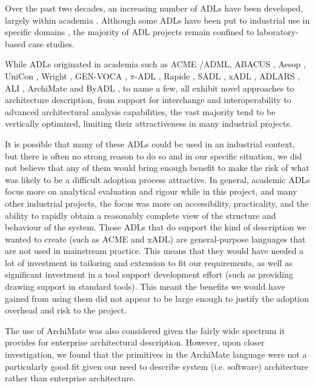   Over the past two decades, an increasing number of ADLs have been developed, largely within academia 
  \cite{medvidovic2000-adlcomparison, clements1996-adlsurvey}. Although some ADLs have been put to industrial use in specific domains
\cite{cuenot2010-east, oquendo2004-piadl, vanommering2000-koala, sae2009-aadl}, the 
majority of ADL projects remain confined to laboratory-based case studies.

  While ADLs originated in academia such as ACME \cite{garlan1997-acme}/ADML, 
  ABACUS \cite{dunsire2005-abacus}, Aesop \cite{garlan1994-aesop}, 
  UniCon \cite{shaw1996-unicon}, Wright \cite{allen1996-wright}, GEN-VOCA \cite{batory1997-genvoca}, $\pi$-ADL \cite{oquendo2004-piadl}, Rapide \cite{luckham1995-rapideexample}, SADL \cite{moriconi1997-sadl}, 
  xADL \cite{khare2001-xadl}, ADLARS \cite{bashroush2005-adlars}, ALI \cite{bashroush2008-ali}, 
  ArchiMate \cite{lankhorst2009-archimate} and ByADL \cite{diruscio2010-byadl}, to name a few, all exhibit novel approaches to architecture description, from support for interchange and interoperability to advanced architectural analysis capabilities, the vast majority tend to be vertically optimized, limiting their attractiveness in many industrial projects.  

  It is possible that many of these ADLs could be used in an industrial context, but there is often no strong reason to do so and in our specific situation, we did not believe that any of them would bring enough benefit to make the risk of what was likely to be a difficult adoption process attractive. In general, academic ADLs focus more on analytical evaluation and rigour while in this project, and many other industrial projects, the focus was more on accessibility, practicality, and the ability to rapidly obtain a reasonably complete view of the structure and behaviour of the system. Those ADLs that do support the kind of description we wanted to create (such as ACME and xADL) are general-purpose languages that are not used in mainstream practice. This means that they would have needed a lot of investment in tailoring and extension to fit our requirements, as well as significant investment in a tool support development effort (such as providing drawing support in standard tools).  This meant the benefits we would have gained from using them did not appear to be large enough to justify the adoption overhead and risk to the project.

  The use of ArchiMate \cite{lankhorst2009-archimate} was also considered given the fairly wide spectrum it provides for enterprise architectural description. However, upon closer investigation, we found that the primitives in the ArchiMate language were not a particularly good fit given our need to describe system (i.e. software) architecture rather than enterprise architecture.

